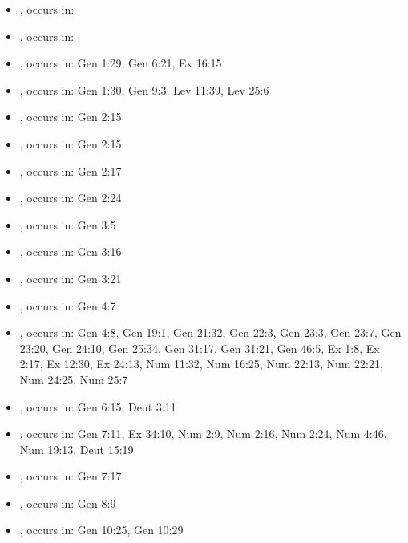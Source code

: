 \documentclass[14pt]{article}
\begin{document}
	\raggedright
\begin{itemize} \item {}, occurs in: 

\item {}, occurs in: 

\item {}, occurs in: Gen 1:29, Gen 6:21, Ex 16:15

\item {}, occurs in: Gen 1:30, Gen 9:3, Lev 11:39, Lev 25:6

\item {}, occurs in: Gen 2:15

\item {}, occurs in: Gen 2:15

\item {}, occurs in: Gen 2:17

\item {}, occurs in: Gen 2:24

\item {}, occurs in: Gen 3:5

\item {}, occurs in: Gen 3:16

\item {}, occurs in: Gen 3:21

\item {}, occurs in: Gen 4:7

\item {}, occurs in: Gen 4:8, Gen 19:1, Gen 21:32, Gen 22:3, Gen 23:3, Gen 23:7, Gen 23:20, Gen 24:10, Gen 25:34, Gen 31:17, Gen 31:21, Gen 46:5, Ex 1:8, Ex 2:17, Ex 12:30, Ex 24:13, Num 11:32, Num 16:25, Num 22:13, Num 22:21, Num 24:25, Num 25:7

\item {}, occurs in: Gen 6:15, Deut 3:11

\item {}, occurs in: Gen 7:11, Ex 34:10, Num 2:9, Num 2:16, Num 2:24, Num 4:46, Num 19:13, Deut 15:19

\item {}, occurs in: Gen 7:17

\item {}, occurs in: Gen 8:9

\item {}, occurs in: Gen 10:25, Gen 10:29


\end{itemize}
\end{document}

